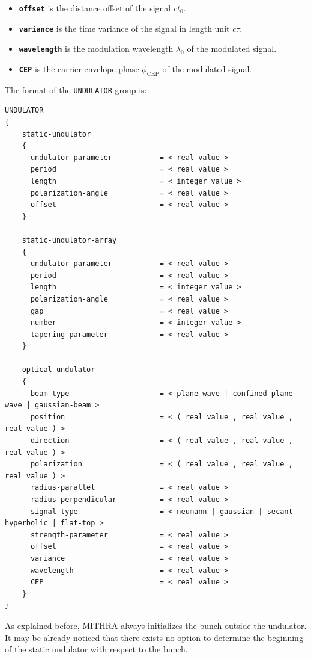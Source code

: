 \begin{enumerate}
\begin{itemize}
	\item \textbf{\texttt{offset}} is the distance offset of the signal $ct_0$.
	\item \textbf{\texttt{variance}} is the time variance of the signal in length unit $c\tau$.
	\item \textbf{\texttt{wavelength}} is the modulation wavelength $\lambda_0$ of the modulated signal.
	\item \textbf{\texttt{CEP}} is the carrier envelope phase $\phi_{\mathrm{CEP}}$ of the modulated signal.
\end{itemize}
\end{enumerate}

The format of the \texttt{UNDULATOR} group is:
%
\begin{Verbatim}[frame=single,fontsize=\small,tabsize=4]
UNDULATOR
{
	static-undulator
	{
	  undulator-parameter           = < real value >
	  period                        = < real value >
	  length                        = < integer value >
      polarization-angle            = < real value >
      offset                        = < real value >
    }
    
    static-undulator-array
    {
      undulator-parameter           = < real value >
      period                        = < real value >
      length                        = < integer value >
      polarization-angle            = < real value >
      gap                           = < real value >
      number                        = < integer value >
      tapering-parameter            = < real value > 
    }
    
    optical-undulator
    {
      beam-type                     = < plane-wave | confined-plane-wave | gaussian-beam >
	  position                      = < ( real value , real value , real value ) >
	  direction                     = < ( real value , real value , real value ) >
	  polarization                  = < ( real value , real value , real value ) >
	  radius-parallel               = < real value >
	  radius-perpendicular          = < real value >
	  signal-type                   = < neumann | gaussian | secant-hyperbolic | flat-top >
	  strength-parameter            = < real value >
	  offset                        = < real value >
	  variance                      = < real value >
	  wavelength                    = < real value >
	  CEP                           = < real value >
	}
}
\end{Verbatim}
%
As explained before, MITHRA always initializes the bunch outside the undulator.
%
It may be already noticed that there exists no option to determine the beginning of the static undulator with respect to the bunch.
